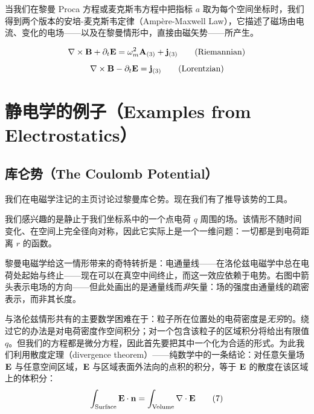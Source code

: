 当我们在黎曼 Proca 方程或麦克斯韦方程中把指标 $a$ 取为每个空间坐标时，我们得到两个版本的安培-麦克斯韦定律（Ampère-Maxwell Law），它描述了磁场由电流、变化的电场——以及在黎曼情形中，直接由磁矢势——所产生。

\begin{keybox}[安培-麦克斯韦定律]
\begin{equation}
\nabla\times\mathbf{B} + \partial_{t}\mathbf{E} = \omega_m^{2}\mathbf{A}_{(3)} + \mathbf{j}_{(3)} \tag{Riemannian}
\end{equation}
\begin{equation}
\nabla\times\mathbf{B} - \partial_{t}\mathbf{E} = \mathbf{j}_{(3)} \tag{Lorentzian}
\end{equation}
\end{keybox}

\section{静电学的例子（Examples from Electrostatics）}

\subsection{库仑势（The Coulomb Potential）}

我们在电磁学注记的主页讨论过黎曼库仑势。现在我们有了推导该势的工具。


我们感兴趣的是静止于我们坐标系中的一个点电荷 $q$ 周围的场。该情形不随时间变化、在空间上完全径向对称，因此它实际上是一个一维问题：一切都是到电荷距离 $r$ 的函数。

黎曼电磁学给这一情形带来的奇特转折是：电通量线——在洛伦兹电磁学中总在电荷处起始与终止——现在可以在真空中间终止，而这一效应依赖于电势。右图中箭头表示电场的方向——但此处画出的是通量线而\emph{非}矢量：场的强度由通量线的疏密表示，而非其长度。

与洛伦兹情形共有的主要数学困难在于：粒子所在位置处的电荷密度是\emph{无穷}的。绕过它的办法是对电荷密度作空间积分；对一个包含该粒子的区域积分将给出有限值 $q$。但我们的方程都是微分方程，因此首先要把其中一个化为合适的形式。为此我们利用散度定理（divergence theorem）——纯数学中的一条结论：对任意矢量场 $\mathbf{E}$ 与任意空间区域，$\mathbf{E}$ 与区域表面外法向的点积的积分，等于 $\mathbf{E}$ 的散度在该区域上的体积分：
\begin{equation}
\int_{\text{Surface}} \mathbf{E}\cdot\mathbf{n} = \int_{\text{Volume}} \nabla\cdot\mathbf{E} \tag{7}
\end{equation}

